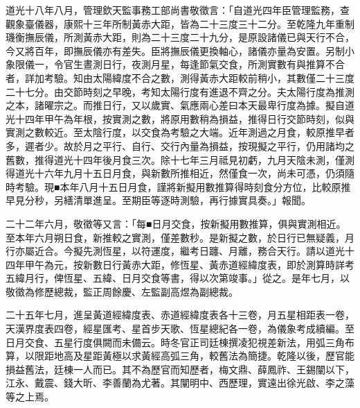 \begin{pinyinscope}
道光十八年八月，管理欽天監事務工部尚書敬徵言：「自道光四年臣管理監務，查觀象臺儀器，康熙十三年所制黃赤大距，皆為二十三度三十二分。至乾隆九年重制璣衡撫辰儀，所測黃赤大距，則為二十三度二十九分，是原設諸儀已與天行不合，今又將百年，即撫辰儀亦有差失。臣將撫辰儀更換軸心，諸儀亦量為安置。另制小象限儀一，令官生晝測日行，夜測月星，每逢節氣交食，所測實數有與推算不合者，詳加考驗。知由太陽緯度不合之數，測得黃赤大距較前稍小，其數僅二十三度二十七分。由交節時刻之早晚，考知太陽行度有進退不齊之分。夫太陽行度為推測之本，諸曜宗之。而推日行，又以歲實、氣應兩心差曰本天最卑行度為據。擬自道光十四年甲午為年根，按實測之數，將原用數稍為損益，推得日行交節時刻，似與實測之數較近。至太陰行度，以交食為考驗之大端。近年測過之月食，較原推早者多，遲者少。故於月之平行、自行、交行內量為損益，按現擬之平行，仍用諸均之舊數，推得道光十四年後月食三次。除十七年三月祗見初虧，九月天陰未測，僅測得道光十六年九月十五日月食，與新數所推相近，然僅食一次，尚未可憑，仍須隨時考驗。現■本年八月十五日月食，謹將新擬用數推算得時刻食分方位，比較原推早見分秒，另繕清單進呈。至期臣等逐時測驗，再行據實具奏。」報聞。

二十二年六月，敬徵等又言：「每■日月交食，按新擬用數推算，俱與實測相近。至本年六月朔日食，新推較之實測，僅差數秒。是新擬之數，於日行已無疑義，月行亦屬近合。今擬先測恆星，以符運度，繼考日躔、月離，務合天行。請以道光十四年甲午為元，按新數日行黃赤大距，修恆星、黃赤道經緯度表，即於測算時詳考五緯月行，俾恆星、五緯、日月交食等書，得以次第竣事。」從之。是年七月，以敬徵為修歷總裁，監正周餘慶、左監副高煜為副總裁。

二十五年七月，進呈黃道經緯度表、赤道經緯度表各十三卷，月五星相距表一卷，天漢界度表四卷，經星匯考、星首步天歌、恆星總紀各一卷，為儀象考成續編。至日月交食、五星行度俱闕而未備云。時冬官正司廷棟撰凌犯視差新法，用弧三角布算，以限距地高及星距黃極以求黃經高弧三角，較舊法為簡捷。乾隆以後，歷官能損益舊法，廷棟一人而已。其不為歷官而知歷者，梅文鼎、薛鳳祚、王錫闡以下，江永、戴震、錢大昕、李善蘭為尤著。其闡明中、西歷理，實遠出徐光啟、李之藻等之上焉。


\end{pinyinscope}